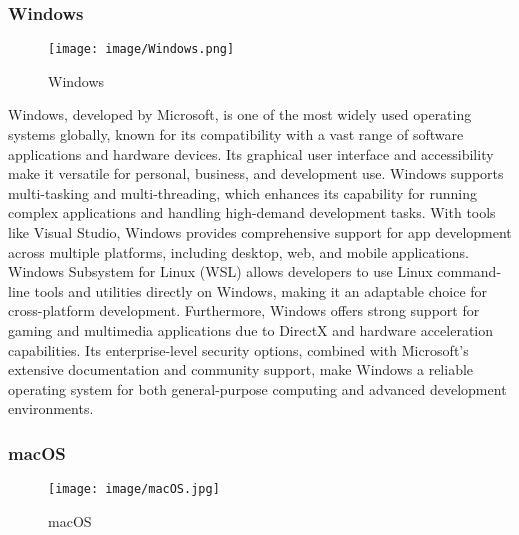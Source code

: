\documentclass[conference]{IEEEtran}
\begin{document}
\subsubsection{Windows}

\begin{figure}[h!]
    \centering
    \texttt{[image: image/Windows.png]}
    \caption{Windows}
    \label{fig:enter-label}
\end{figure}

\noindent Windows, developed by Microsoft, is one of the most widely used operating systems globally, known for its compatibility with a vast range of software applications and hardware devices. Its graphical user interface and accessibility make it versatile for personal, business, and development use. Windows supports multi-tasking and multi-threading, which enhances its capability for running complex applications and handling high-demand development tasks. With tools like Visual Studio, Windows provides comprehensive support for app development across multiple platforms, including desktop, web, and mobile applications. Windows Subsystem for Linux (WSL) allows developers to use Linux command-line tools and utilities directly on Windows, making it an adaptable choice for cross-platform development. Furthermore, Windows offers strong support for gaming and multimedia applications due to DirectX and hardware acceleration capabilities. Its enterprise-level security options, combined with Microsoft’s extensive documentation and community support, make Windows a reliable operating system for both general-purpose computing and advanced development environments. \\

\subsubsection{macOS}

\begin{figure}[h!]
    \centering
    \texttt{[image: image/macOS.jpg]}
    \caption{macOS}
    \label{fig:enter-label}
\end{figure}
\end{document}
